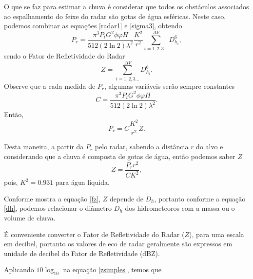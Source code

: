 O que se faz para estimar a chuva é considerar que todos os obstáculos associados ao espalhamento do feixe do radar são gotas de água esféricas. Neste caso, podemos combinar as equações \ref{radar1} e \ref{sigma3}, obtendo
\begin{equation}
P_r = \dfrac{\pi^3 P_t G^2  \phi \varphi H }{ 512 (2\ln2) \lambda^2 } \dfrac{ K^2  }{ r^2 }  \sum_{i=1, 2, 3 ... }^{\Delta V}  D_{h_i}^6, 
\end{equation} 
sendo o Fator de Refletividade do Radar
\begin{equation}
Z =  \sum_{i=1, 2, 3 ... }^{\Delta V}  D_{h_i}^6.
\label{fz}
\end{equation}
Observe que a cada medida de $P_r$, algumas variáveis serão sempre constantes 
\begin{equation}
C = \dfrac{\pi^3 P_t G^2  \phi \varphi H }{ 512 (2\ln2) \lambda^2 } .
\end{equation}
Então,
\begin{equation}
P_r = C \dfrac{K^2}{r^2}  Z.
\end{equation}

Desta maneira, a partir da $P_r$ pelo radar, sabendo a distância $r$ do alvo e considerando que a chuva é composta de gotas de água, então podemos saber $Z$ 
\begin{equation}
Z = \dfrac{P_r r^2}{C K^2},
\label{zsimples}
\end{equation}
pois, $K^2=0.931$ para água líquida.


Conforme mostra a equação \ref{fz}, $Z$ depende de $D_h$, portanto conforme a equação \ref{dh}, podemos relacionar o diâmetro $D_h$ dos hidrometeoros com a massa ou o volume de chuva.  

É conveniente converter o Fator de Refletividade do Radar ($Z$), para uma escala em decibel, portanto os valores de eco de radar geralmente são expressos em unidade de decibel do Fator de Refletividade (dBZ). 

Aplicando $10\log_{10}$ na equação \ref{zsimples}, temos que

